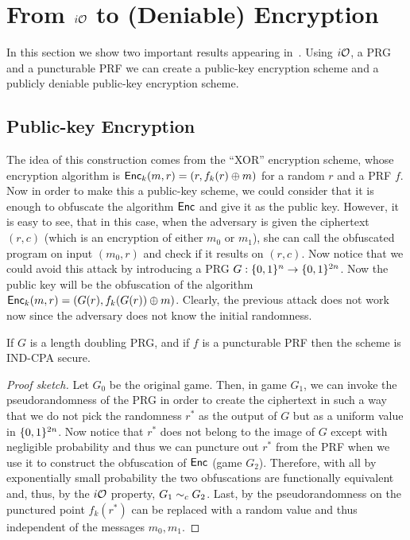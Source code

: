 \section{From $i\mathcal{O}$ to (Deniable) Encryption}
\label{sec:iO-deniable}

In this section we show two important results appearing in~\cite{iO-deniable}. Using $i\mathcal{O}$, a PRG and a puncturable PRF we can create a public-key encryption scheme and a publicly deniable public-key encryption scheme.

\subsection{Public-key Encryption}
The idea of this construction comes from the ``XOR'' encryption scheme, whose encryption algorithm is $\mathsf{Enc}_k(m,r)=(r,f_k(r)\oplus m)$ for a random $r$ and a PRF $f$. Now in order to make this a public-key scheme, we could consider that it is enough to obfuscate the algorithm $\mathsf{Enc}$ and give it as the public key. However, it is easy to see, that in this case, when the adversary is given the ciphertext $(r,c)$ (which is an encryption of either $m_0$ or $m_1$), she can call the obfuscated program on input $(m_0,r)$ and check if it results on $(r,c)$. Now notice that we could avoid this attack by introducing a PRG $G:\{0,1\}^n\to\{0,1\}^{2n}$. Now the public key will be the obfuscation of the algorithm $\mathsf{Enc}_k(m,r)=(G(r),f_k(G(r))\oplus m)$. Clearly, the previous attack does not work now since the adversary does not know the initial randomness.

\begin{mytheorem}
If $G$ is a length doubling PRG, and if $f$ is a puncturable PRF then the scheme is IND-CPA secure.
\end{mytheorem}
\begin{proof}[Proof sketch]
Let $G_0$ be the original game. Then, in game $G_1$, we can invoke the pseudorandomness of the PRG in order to create the ciphertext in such a way that we do not pick the randomness $r^*$ as the output of $G$ but as a uniform value in $\{0,1\}^{2n}$. Now notice that $r^*$ does not belong to the image of $G$ except with negligible probability and thus we can puncture out $r^*$ from the PRF when we use it to construct the obfuscation of $\mathsf{Enc}$ (game $G_2$). Therefore, with all by exponentially small probability the two obfuscations are functionally equivalent and, thus, by the $i\mathcal{O}$ property, $G_1\sim_c G_2$. Last, by the pseudorandomness on the punctured point $f_k(r^*)$ can be replaced with a random value and thus independent of the messages $m_0,m_1$. 
\end{proof}

